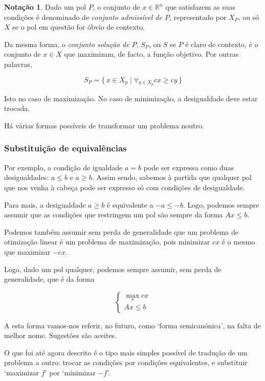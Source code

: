 \documentclass{article}
\newcommand{\R}{\mathbb{R}}
\theoremstyle{definition}
\newtheorem*{notacao}{Notação}
\begin{document}
	\begin{notacao}
	Dado um pol $P$, o conjunto de $x \in \R^n$ que satisfazem as suas condições é denominado de \emph{conjunto admissível de $P$}, representado por $X_P$, ou só $X$ se o pol em questão for óbvio de contexto.
	
	Da mesma forma, o \emph{conjunto solução de $P$}, $S_P$, ou $S$ se $P$ é claro de contexto, é o conjunto de $x \in X$ que maximizam, de facto, a função objetivo. Por outras palavras,
	
	\[S_P = \{\,x \in X_p \mid \forall_{y \in X_p} cx \geq cy\,\}\]
	
	Isto no caso de maximização. No caso de minimização, a desigualdade deve estar trocada.
	\end{notacao}
	
	Há várias formas possíveis de transformar um problema noutro.
	
	\subsubsection{Substituição de equivalências}
	
	Por exemplo, a condição de igualdade $a = b$ pode ser expressa como duas desigualdades: $a \leq b$ e $a \geq b$. Assim sendo, sabemos à partida que qualquer pol que nos venha à cabeça pode ser expresso só com condições de desigualdade.
	
	Para mais, a desigualdade $a \geq b$ é equivalente a $-a \leq -b$. Logo, podemos sempre assumir que as condições que restringem um pol são sempre da forma $Ax \leq b$.
	
	Podemos também assumir sem perda de generalidade que um problema de otimização linear é um problema de maximização, pois minimizar $cx$ é o mesmo que maximizar $-cx$.
	
	Logo, dado um pol qualquer, podemos sempre assumir, sem perda de generalidade, que é da forma
	
	\[
	\begin{cases}
	\max\limits_x cx\\
	Ax \leq b
	\end{cases}
	\]
	
	A esta forma vamos-nos referir, no futuro, como `forma semicanónica', na falta de melhor nome. Sugestões são aceites.
	
	O que foi até agora descrito é o tipo mais simples possível de tradução de um problema a outro: trocar as condições por condições equivalentes, e substituir `maximizar $f$' por `minimizar $-f$'.
	
\end{document}
